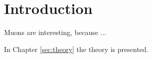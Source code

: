 \chapter{Introduction}

Muons are interesting, because ...

In Chapter \ref{sec:theory} the theory is presented.